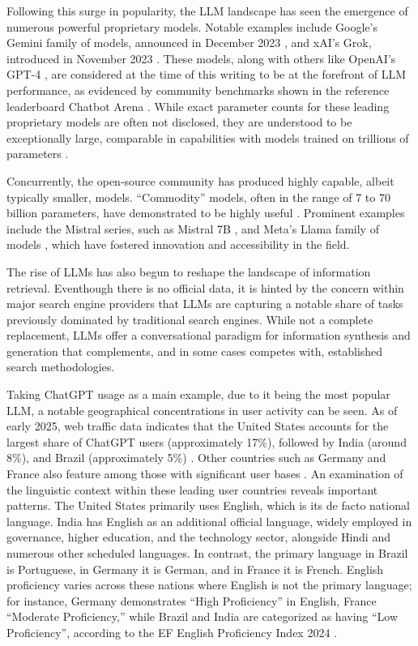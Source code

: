 Following this surge in popularity, the LLM landscape has seen the emergence of numerous powerful proprietary models. Notable examples include Google's Gemini family of models, announced in December 2023 \cite{PichaiHassabis2023Gemini, Rane_Choudhary_Rane_2024}, and xAI's Grok, introduced in November 2023 \cite{xaiGrok2023}. These models, along with others like OpenAI's GPT-4 \cite{openai2023gpt4}, are considered at the time of this writing to be at the forefront of LLM performance, as evidenced by community benchmarks shown in the reference leaderboard Chatbot Arena \cite{chiang2024chatbotarenaopenplatform}. 
While exact parameter counts for these leading proprietary models are often not disclosed, they are understood to be exceptionally large, comparable in capabilities with models trained on trillions of parameters \cite{PichaiHassabisGemini2024}.

Concurrently, the open-source community has produced highly capable, albeit typically smaller, models. ``Commodity'' models, often in the range of 7 to 70 billion parameters, have demonstrated to be highly useful \cite{liu2023llm360fullytransparentopensource}. Prominent examples include the Mistral series, such as Mistral 7B \cite{jiang2023mistral7b}, and Meta's Llama family of models \cite{touvron2023llamaopenefficientfoundation}, which have fostered innovation and accessibility in the field.

The rise of LLMs has also begun to reshape the landscape of information retrieval.
Eventhough there is no official data, it is hinted by the concern within major search engine providers \cite{liu2024llm} that LLMs are capturing a notable share of tasks previously dominated by traditional search engines.
While not a complete replacement, LLMs offer a conversational paradigm for information synthesis and generation that complements, and in some cases competes with, established search methodologies.

Taking ChatGPT usage as a main example, due to it being the most popular LLM, a notable geographical concentrations in user activity can be seen. As of early 2025, web traffic data indicates that the United States accounts for the largest share of ChatGPT users (approximately 17\%), followed by India (around 8\%), and Brazil (approximately 5\%) \cite{SemrushChatGPTStatsApril2025}. Other countries such as Germany and France also feature among those with significant user bases \cite{SemrushChatGPTStatsApril2025, Views4YouChatGPTGlobal}.
An examination of the linguistic context within these leading user countries reveals important patterns. 
The United States primarily uses English, which is its de facto national language. 
India has English as an additional official language, widely employed in governance, higher education, and the technology sector, alongside Hindi and numerous other scheduled languages. 
In contrast, the primary language in Brazil is Portuguese, in Germany it is German, and in France it is French. 
English proficiency varies across these nations where English is not the primary language; for instance, Germany demonstrates ``High Proficiency'' in English, France ``Moderate Proficiency,'' while Brazil and India are categorized as having ``Low Proficiency'', according to the EF English Proficiency Index 2024 \cite{EFEPI2024}.

